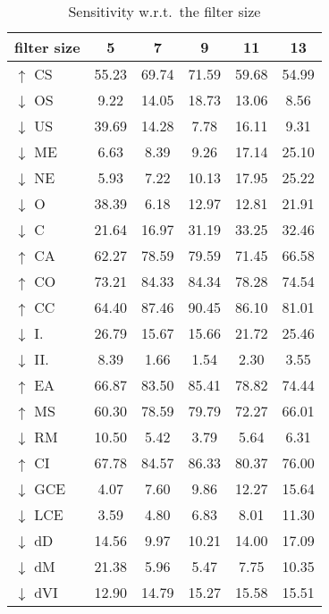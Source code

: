 \documentclass[journal]{IEEEtran}
\begin{document}
\begin{table}
	\centering
	\caption{Sensitivity w.r.t.\ the filter size}
	\begin{tabular}{@{} l *{5}{S[table-format=2.3,detect-inline-weight=math,table-align-text-post=false]} @{}}
		\toprule
		{filter size} & {5} & {7} & {9} & {11} & {13}   \\
		\midrule
		$\uparrow$ CS    & 55.23 & 69.74 & 71.59 & 59.68 & 54.99 \\
		$\downarrow$ OS  & 9.22 & 14.05 & 18.73 & 13.06 & 8.56 \\
		$\downarrow$ US  & 39.69 & 14.28 & 7.78 & 16.11 & 9.31 \\
		$\downarrow$ ME  & 6.63 & 8.39 & 9.26 & 17.14 & 25.10 \\
		$\downarrow$ NE  & 5.93 & 7.22 & 10.13 & 17.95 & 25.22 \\
		$\downarrow$ O   & 38.39 & 6.18 & 12.97 & 12.81 & 21.91 \\
		$\downarrow$ C   & 21.64 & 16.97 & 31.19 & 33.25 & 32.46 \\
		$\uparrow$ CA    & 62.27 & 78.59 & 79.59 & 71.45 & 66.58 \\
		$\uparrow$ CO    & 73.21 & 84.33 & 84.34 & 78.28 & 74.54 \\
		$\uparrow$ CC    & 64.40 & 87.46 & 90.45 & 86.10 & 81.01 \\
		$\downarrow$ I.  & 26.79 & 15.67 & 15.66 & 21.72 & 25.46 \\
		$\downarrow$ II. & 8.39 & 1.66 & 1.54 & 2.30 & 3.55 \\
		$\uparrow$ EA    & 66.87 & 83.50 & 85.41 & 78.82 & 74.44 \\
		$\uparrow$ MS    & 60.30 & 78.59 & 79.79 & 72.27 & 66.01 \\
		$\downarrow$ RM  & 10.50 & 5.42 & 3.79 & 5.64 & 6.31 \\
		$\uparrow$ CI    & 67.78 & 84.57 & 86.33 & 80.37 & 76.00 \\
		$\downarrow$ GCE & 4.07 & 7.60 & 9.86 & 12.27 & 15.64 \\
		$\downarrow$ LCE & 3.59 & 4.80 & 6.83 & 8.01 & 11.30 \\
		$\downarrow$ dD  & 14.56 & 9.97 & 10.21 & 14.00 & 17.09 \\
		$\downarrow$ dM  & 21.38 & 5.96 & 5.47 & 7.75 & 10.35 \\
		$\downarrow$ dVI & 12.90 & 14.79 & 15.27 & 15.58 & 15.51 \\
		\bottomrule
	\end{tabular}
	\label{tbl:paramsense_filter_size}
\end{table}
\end{document}
